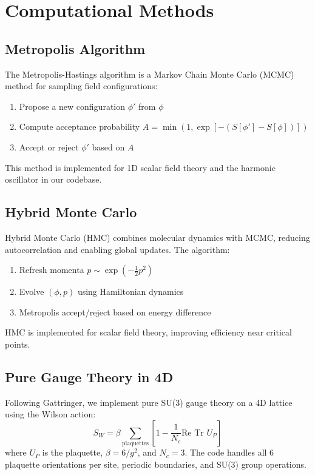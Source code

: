 \documentclass[12pt]{article}
\begin{document}
\section{Computational Methods}
\subsection{Metropolis Algorithm}
The Metropolis-Hastings algorithm is a Markov Chain Monte Carlo (MCMC) method for sampling field configurations:
\begin{enumerate}
    \item Propose a new configuration $\phi'$ from $\phi$
    \item Compute acceptance probability $A = \min(1, \exp[-(S[\phi'] - S[\phi])])$
    \item Accept or reject $\phi'$ based on $A$
\end{enumerate}
This method is implemented for 1D scalar field theory and the harmonic oscillator in our codebase.

\subsection{Hybrid Monte Carlo}
Hybrid Monte Carlo (HMC) combines molecular dynamics with MCMC, reducing autocorrelation and enabling global updates. The algorithm:
\begin{enumerate}
    \item Refresh momenta $p \sim \exp(-\frac{1}{2}p^2)$
    \item Evolve $(\phi, p)$ using Hamiltonian dynamics
    \item Metropolis accept/reject based on energy difference
\end{enumerate}
HMC is implemented for scalar field theory, improving efficiency near critical points.

\subsection{Pure Gauge Theory in 4D}
Following Gattringer, we implement pure SU(3) gauge theory on a 4D lattice using the Wilson action:
\begin{equation}
S_W = \beta \sum_{\text{plaquettes}} \left[1 - \frac{1}{N_c} \text{Re Tr } U_P\right]
\end{equation}
where $U_P$ is the plaquette, $\beta = 6/g^2$, and $N_c = 3$. The code handles all 6 plaquette orientations per site, periodic boundaries, and SU(3) group operations.
\end{document}
